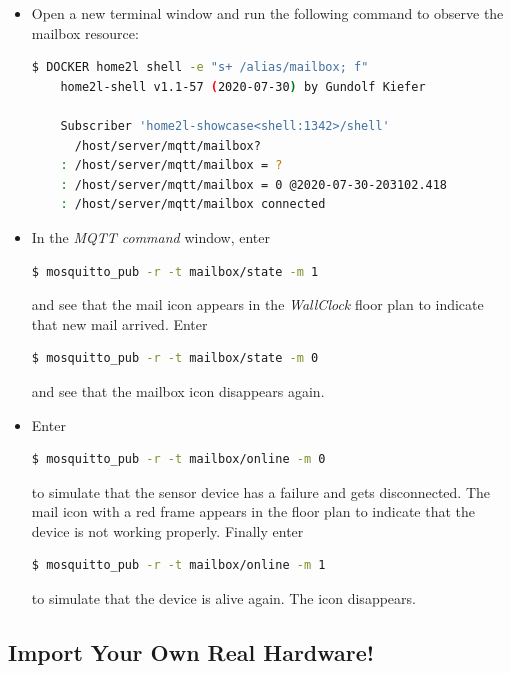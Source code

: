 \documentclass[12pt,english,parskip=half,headheight=19pt]{scrreprt}
\begin{document}
\begin{itemize}[$\blacktriangleright$]

\item
  Open a new terminal window and run the following command to observe the mailbox resource:
  \begin{lstlisting}[language=bash]
    $ DOCKER home2l shell -e "s+ /alias/mailbox; f"
    home2l-shell v1.1-57 (2020-07-30) by Gundolf Kiefer

    Subscriber 'home2l-showcase<shell:1342>/shell'
      /host/server/mqtt/mailbox?
    : /host/server/mqtt/mailbox = ?
    : /host/server/mqtt/mailbox = 0 @2020-07-30-203102.418
    : /host/server/mqtt/mailbox connected
  \end{lstlisting}

\item
  In the \textit{MQTT command} window, enter
  \begin{lstlisting}[language=bash]
    $ mosquitto_pub -r -t mailbox/state -m 1
  \end{lstlisting}
  and see that the mail icon appears in the \textit{WallClock} floor plan to indicate that new mail arrived.
  Enter
  \begin{lstlisting}[language=bash]
    $ mosquitto_pub -r -t mailbox/state -m 0
  \end{lstlisting}
  and see that the mailbox icon disappears again.

\item
  Enter
  \begin{lstlisting}[language=bash]
    $ mosquitto_pub -r -t mailbox/online -m 0
  \end{lstlisting}
  to simulate that the sensor device has a failure and gets disconnected. The mail icon with a red frame
  appears in the floor plan to indicate that the device is not working properly.
  Finally enter
  \begin{lstlisting}[language=bash]
    $ mosquitto_pub -r -t mailbox/online -m 1
  \end{lstlisting}
  to simulate that the device is alive again. The icon disappears.

\end{itemize}



\subsection{Import Your Own Real Hardware!}
\label{sec:tutorial-mqtt-real}
\end{document}
